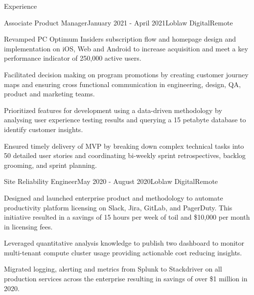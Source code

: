 \documentclass{resume} %
\begin{document}

\begin{rSection}{Experience}

\begin{rSubsection}{Associate Product Manager}{January 2021 - April 2021}{Loblaw Digital}{Remote}
\item Revamped PC Optimum Insiders subscription flow and homepage design and implementation on iOS, Web and Android to increase acquisition and meet a key performance indicator of 250,000 active users. 
\item Facilitated decision making on program promotions by creating customer journey maps and ensuring cross functional communication in engineering, design, QA, product and marketing teams. 
\item Prioritized features for development using a data-driven methodology by analysing user experience testing results and querying a 15 petabyte database to identify customer insights.
\item  Ensured timely delivery of MVP by breaking down complex technical tasks into 50 detailed user stories and coordinating bi-weekly sprint retrospectives, backlog grooming, and sprint planning.
\end{rSubsection}


\begin{rSubsection}{Site Reliability Engineer}{May 2020 - August 2020}{Loblaw Digital}{Remote}
\item Designed and launched enterprise product and methodology to automate productivity platform licensing on Slack, Jira, GitLab, and PagerDuty. This initiative resulted in a savings of 15 hours per week of toil and \$10,000 per month in licensing fees. 
\item Leveraged quantitative analysis knowledge to publish two dashboard to monitor multi-tenant compute cluster usage providing actionable cost reducing insights.
\item Migrated logging, alerting and metrics from Splunk to Stackdriver on all production services across the enterprise resulting in savings of over \$1 million in 2020.
\end{rSubsection}



\end{rSection}
\end{document}
